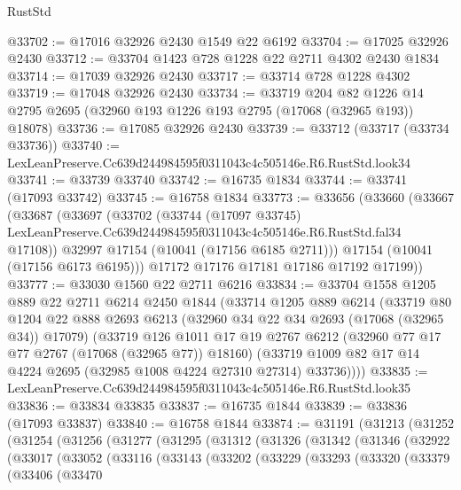 \begin{lexlean}{RustStd}
\begin{coremodule}
@33702 := @17016 @32926 @2430 @1549 @22 @6192
@33704 := @17025 @32926 @2430
@33712 := @33704 @1423 @728 @1228 @22 @2711 @4302 @2430 @1834
@33714 := @17039 @32926 @2430
@33717 := @33714 @728 @1228 @4302
@33719 := @17048 @32926 @2430
@33734 := @33719
    @204
    @82
    @1226
    @14
    @2795
    @2695
    (@32960 @193 @1226 @193 @2795 (@17068 (@32965 @193)) @18078)
@33736 := @17085 @32926 @2430
@33739 := @33712 (@33717 (@33734 @33736))
@33740 := LexLeanPreserve.Cc639d244984595f0311043c4c505146e.R6.RustStd.look34
@33741 := @33739 @33740
@33742 := @16735 @1834
@33744 := @33741 (@17093 @33742)
@33745 := @16758 @1834
@33773 := @33656
    (@33660
      (@33667
        (@33687
          (@33697
            (@33702
              (@33744
                (@17097 @33745)
                LexLeanPreserve.Cc639d244984595f0311043c4c505146e.R6.RustStd.fal34
                @17108))
            @32997
            @17154
            (@10041 (@17156 @6185 @2711)))
          @17154
          (@10041 (@17156 @6173 @6195)))
        @17172
        @17176
        @17181
        @17186
        @17192
        @17199))
@33777 := @33030 @1560 @22 @2711 @6216
@33834 := @33704
    @1558
    @1205
    @889
    @22
    @2711
    @6214
    @2450
    @1844
    (@33714
      @1205
      @889
      @6214
      (@33719
        @80
        @1204
        @22
        @888
        @2693
        @6213
        (@32960 @34 @22 @34 @2693 (@17068 (@32965 @34)) @17079)
        (@33719
          @126
          @1011
          @17
          @19
          @2767
          @6212
          (@32960 @77 @17 @77 @2767 (@17068 (@32965 @77)) @18160)
          (@33719 @1009 @82 @17 @14 @4224 @2695 (@32985 @1008 @4224 @27310 @27314) @33736))))
@33835 := LexLeanPreserve.Cc639d244984595f0311043c4c505146e.R6.RustStd.look35
@33836 := @33834 @33835
@33837 := @16735 @1844
@33839 := @33836 (@17093 @33837)
@33840 := @16758 @1844
@33874 := @31191
    (@31213
      (@31252
        (@31254
          (@31256
            (@31277
              (@31295
                (@31312
                  (@31326
                    (@31342
                      (@31346
                        (@32922
                          (@33017
                            (@33052
                              (@33116
                                (@33143
                                  (@33202
                                    (@33229
                                      (@33293
                                        (@33320
                                          (@33379
                                            (@33406
                                              (@33470

\end{coremodule}
\end{lexlean}
